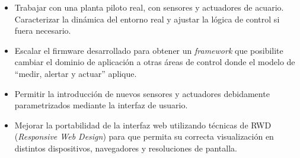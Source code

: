 \begin{itemize}
	\item Trabajar con una planta piloto real, con sensores y actuadores de acuario.  Caracterizar la dinámica del entorno real y ajustar la lógica de control si fuera necesario.
	\vspace{5px}
	\item Escalar el firmware desarrollado para obtener un \textit{framework} que posibilite cambiar el dominio de aplicación a otras áreas de control donde el modelo de ``medir, alertar y actuar'' aplique.
	\vspace{5px}
	\item Permitir la introducción de nuevos sensores y actuadores debidamente parametrizados mediante la interfaz de usuario.
	\vspace{5px}
	\item Mejorar la portabilidad de la interfaz web utilizando técnicas de RWD (\textit{Responsive Web Design}) para que permita su correcta visualización en distintos dispositivos, navegadores y resoluciones de pantalla.
\end{itemize}






